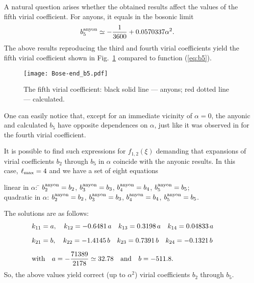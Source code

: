 \documentclass[12pt,a4paper]{article}
\begin{document}
{A natural question arises whether the obtained results affect the values of the fifth virial coefficient. For anyons, it equals in the bosonic limit \cite{Dasnieres&Ouvry:1992}
\begin{equation}\label{eq:b5}
b_5^{\rm anyon} \simeq -\frac{1}{3600} + 0.0570337 \alpha^2.
\end{equation}
The above results reproducing the third and fourth virial coefficients yield the fifth virial coefficient shown in  Fig.~\ref{fig:b5Bose} compared to function (\ref{eq:b5}).

\begin{figure}[h]
\centerline{\texttt{[image: Bose-end\_b5.pdf]}}
\caption{The fifth virial coefficient:
black solid line --- anyons;
red dotted line --- calculated.
}\label{fig:b5Bose}
\end{figure}

One can easily notice that, except for an immediate vicinity of $\alpha=0$, the anyonic and calculated $b_5$ have opposite dependences on $\alpha$, just like it was observed in \cite{Rovenchak:2014EPJB,Hornetska&Rovenchak:2016en} for the fourth virial coefficient.

It is possible to find such expressions for $f_{1,2}(\xi)$ demanding that expansions of virial coefficients $b_2$ through $b_5$ in $\alpha$ coincide with the anyonic results. In this case, $\ell_{\rm max} = 4$ and we have a set of eight equations
\begin{tabbing}
linear in $\alpha$: \qquad \= $b_2^{\rm anyon} = b_2$, \quad 
$b_3^{\rm anyon} = b_3$, \quad
$b_4^{\rm anyon} = b_4$, \quad
$b_5^{\rm anyon} = b_5$;\\[12pt]
quadratic in $\alpha$: \>$b_2^{\rm anyon} = b_2$, \quad 
$b_3^{\rm anyon} = b_3$, \quad
$b_4^{\rm anyon} = b_4$, \quad
$b_5^{\rm anyon} = b_5$.
\end{tabbing}
The solutions are as follows:
\begin{align}
&\hspace*{-0.5cm}
k_{11} = a, \quad
k_{12} = -0.6481\, a\quad
k_{13} = 0.3198\, a\quad
k_{14} = 0.04833\, a\nonumber\\[6pt]
%
&\hspace*{-0.5cm}
k_{21} = b, \quad
k_{22} = -1.4145\, b\quad
k_{23} = 0.7391\, b\quad
k_{24} = -0.1321\, b\\[6pt]
&\hspace*{-0.5cm}
\textrm{with}\quad
a = -\frac{71389}{2178}\simeq32.78\quad\textrm{and}\quad
b = -511.8.\nonumber
\end{align}
So, the above values yield correct (up to $\alpha^2$) virial coefficients $b_2$ through $b_5$. 


}
\end{document}

